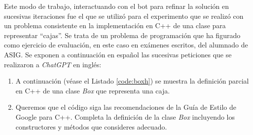 \documentclass[twocolumn,twoside,a4paper, 10pt]{article}
\newcommand{\ChatGPT}{\textit{ChatGPT}{}}           %
\begin{document}

Este modo de trabajo, interactuando con el bot para refinar la solución en sucesivas iteraciones fue el que se
utilizó para el experimento que se realizó con un problema consistente en la implementación en C++ de una
clase para representar ``cajas''. 
Se trata de un problema de programación que ha figurado como ejercicio de evaluación, en este caso
en exámenes escritos, del alumnado de ASIG.
Se exponen a continuación en español las sucesivas peticiones que se realizaron a \ChatGPT{} en inglés:
\begin{enumerate}
  \item A continuación (véase el Listado \ref{code:boxh}) se muestra la definición parcial en C++ de una clase \textit{Box}
    que representa una caja.
  \item Queremos que el código siga las recomendaciones de la Guía de Estilo de Google para C++.
        Completa la definición de la clase \textit{Box} incluyendo los constructores y métodos que consideres
        adecuado.


\end{enumerate}
\end{document}
